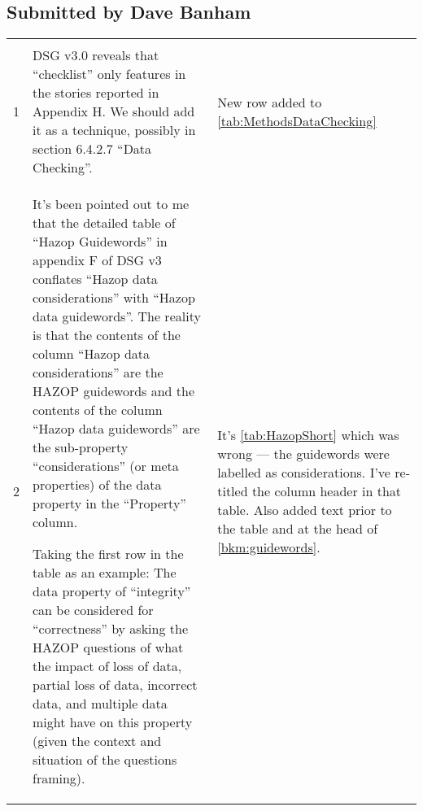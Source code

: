 \subsection{Submitted by Dave Banham}
\begin{longtable}[H]
{|L{}|L{}|L{}|}
\hline
{} &  & \\
\hline
  \endfirsthead
  \hline{} &  & \\\hline
  \endhead
  \endfoot
  \endlastfoot

  1&DSG v3.0 reveals that “checklist” only features in the stories reported in Appendix H. We should add it as a technique, possibly in section 6.4.2.7 “Data Checking”.&New row added to \autoref{tab:MethodsDataChecking}\\\hline
  2&It’s been pointed out to me that the detailed table of “Hazop Guidewords” in appendix F of DSG v3 conflates “Hazop data considerations” with “Hazop data guidewords”. The reality is that the contents of the column “Hazop data considerations” are the HAZOP guidewords and the contents of the column “Hazop data guidewords” are the sub-property “considerations” (or meta properties) of the data property in the “Property” column.

  Taking the first row in the table as an example: The data property of “integrity” can be considered for “correctness” by asking the HAZOP questions of what the impact of loss of data, partial loss of data, incorrect data, and multiple data might have on this property (given the context and situation of the questions framing).&It's \autoref{tab:HazopShort} which was wrong --- the guidewords were labelled as considerations. I've re-titled the column header in that table. Also added text prior to the table and at the head of \autoref{bkm:guidewords}.\\\hline
\end{longtable}

